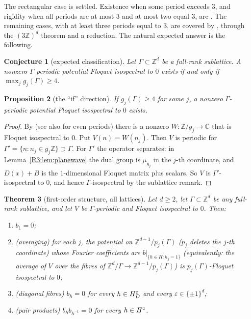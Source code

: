 \documentclass[11pt]{amsart}
\newtheorem{theorem}{Theorem}[section]
\newtheorem{proposition}[theorem]{Proposition}
\newtheorem{conjecture}[theorem]{Conjecture}
\theoremstyle{definition}
\theoremstyle{remark}
\providecommand{\C}{\mathbb C}
\providecommand{\Z}{\mathbb Z}
\begin{document}
The rectangular case is settled. Existence when some period exceeds $3$, and
rigidity when all periods are at most $3$ and at most two equal $3$, are
\cite[Theorem~C]{R3-CFK}. The remaining cases, with at least three periods equal
to $3$, are covered by \cite[Part~XII]{K-034}, through the $(3\Z)^d$ theorem and a
reduction. The natural expected answer is the following.

\begin{conjecture}[expected classification]\label{R3:conj:classification}
Let $\Gamma\subset\Z^d$ be a full-rank sublattice. A nonzero $\Gamma$-periodic
potential Floquet isospectral to $0$ exists if and only if $\max_jg_j(\Gamma)\ge4$.
\end{conjecture}

\begin{proposition}[the ``if'' direction]\label{R3:prop:if}
If $g_j(\Gamma)\ge4$ for some $j$, a nonzero $\Gamma$-periodic potential Floquet
isospectral to $0$ exists.
\end{proposition}

\begin{proof}
By \cite[Theorem~4.3]{R3-CFK} (see also \cite{R3-FLMPRTTZ} for even periods) there
is a nonzero $W:\Z/g_j\to\C$ that is Floquet isospectral to $0$. Put
$V(n)=W(n_j)$. Then $V$ is periodic for $\Gamma'=\{n:n_j\in g_j\Z\}\supset\Gamma$.
For $\Gamma'$ the operator separates: in Lemma~\ref{R3:lem:planewave} the dual
group is $\mu_{g_j}$ in the $j$-th coordinate, and $D(x)+B$ is the $1$-dimensional
Floquet matrix plus scalars. So $V$ is $\Gamma'$-isospectral to $0$, and hence
$\Gamma$-isospectral by the sublattice remark.
\end{proof}

\begin{theorem}[first-order structure, all lattices]\label{R3:thm:structure}
Let $d\ge2$, let $\Gamma\subset\Z^d$ be any full-rank sublattice, and let $V$ be
$\Gamma$-periodic and Floquet isospectral to $0$. Then:
\begin{enumerate}
\item[(i)] $b_1=0$;
\item[(ii)] \emph{(averaging)} for each $j$, the potential on $\Z^{d-1}/p_j(\Gamma)$
($p_j$ deletes the $j$-th coordinate) whose Fourier coefficients are
$b|_{\{h\in H:h_j=1\}}$ (equivalently: the average of $V$ over the fibres of
$\Z^d/\Gamma\to\Z^{d-1}/p_j(\Gamma)$) is $p_j(\Gamma)$-Floquet isospectral to $0$;
\item[(iii)] \emph{(diagonal fibres)} $b_h=0$ for every $h\in H_{D}^{\varepsilon}$ and
every $\varepsilon\in\{\pm1\}^d$;
\item[(iv)] \emph{(pair products)} $b_hb_{h^{-1}}=0$ for every $h\in H^{\circ}$.
\end{enumerate}
\end{theorem}
\end{document}
